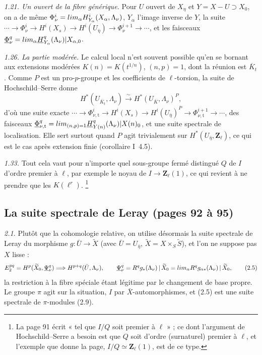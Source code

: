 \documentclass[11pt,a4paper]{article}
\begin{document}
\emph{1.21. Un ouvert de la fibre générique.} Pour $U$ ouvert de $X_\eta$ et
$Y = X - U \supset X_0$, on a de même $\Phi^i_\nu = \varinjlim_\alpha
H^i_{Y_\alpha}(X_\alpha, \Lambda_\nu)$, $Y_\alpha$ l'image inverse de $Y$, la
suite $\cdots \to \Phi^i_\nu \to H^i(X_s) \to H^i(U_{\bar\eta}) \to
\Phi^{i+1}_\nu \to \cdots$, et les faisceaux $\underline\Phi^q_\nu =
\varinjlim_\alpha \underline H^q_{Y_\alpha}(\Lambda_\nu)|X_{\alpha,0}$.

\emph{1.26. La partie modérée.} Le calcul local n'est souvent possible qu'en se
bornant aux extensions modérées $K(n) = K(t^{1/n})$, $(n,p) = 1$, dont la
réunion est $\overline K_t$. Comme $P$ est un pro-$p$-groupe et les coefficients
de $\ell$-torsion, la suite de Hochschild--Serre donne
\[
  H^*(U_{\overline K_t}, \Lambda_\nu) \xrightarrow{\ \sim\ } H^*(U_{\overline K}, \Lambda_\nu)^P ,
\]
d'où une suite exacte $\cdots \to \Phi^i_{\nu,\mathrm{t}} \to H^i(X_s) \to
H^i(U_{\bar\eta})^P \to \Phi^{i+1}_{\nu,\mathrm{t}} \to \cdots$, des faisceaux
$\underline\Phi^q_{\nu,\mathrm{t}} = \varinjlim_{(n,p)=1}
\underline H^q_{Y(n)}(\Lambda_\nu)|X(n)_0$, et une suite spectrale de
localisation. Elle sert surtout quand $P$ agit trivialement sur
$H^*(U_{\bar\eta}, \mathbf{Z}_\ell)$, ce qui est le cas après extension finie
(corollaire I~4.5).

\emph{1.33.} Tout cela vaut pour n'importe quel sous-groupe fermé distingué $Q$
de $I$ d'ordre premier à $\ell$, par exemple le noyau de
$I \to \mathbf{Z}_\ell(1)$, ce qui revient à ne prendre que les $K(\ell^r)$.
\footnote{La page 91 écrit « tel que $I/Q$ soit premier à $\ell$ » ; ce dont
l'argument de Hochschild--Serre a besoin est que $Q$ soit d'ordre (surnaturel)
premier à $\ell$, et l'exemple que donne la page, $I/Q \simeq
\mathbf{Z}_\ell(1)$, est de ce type.}

\subsection*{La suite spectrale de Leray (pages 92 à 95)}

\emph{2.1.} Plutôt que la cohomologie relative, on utilise désormais la suite
spectrale de Leray du morphisme $g : \bar U \to \widetilde X$ (avec
$\bar U = U_{\bar\eta}$, $\widetilde X = X \times_S \widetilde S$), et l'on ne
suppose pas $X$ lisse :
\[
  E_2^{pq} = H^p(\widetilde X_0, \underline\Psi^q_\nu) \Longrightarrow
  H^{p+q}(\bar U, \Lambda_\nu), \qquad
  \underline\Psi^q_\nu = R^q g_*(\Lambda_\nu)\,|\,\widetilde X_0
  = \varinjlim_\alpha R^q g_{\alpha *}(\Lambda_\nu)\,|\,\widetilde X_0 ,
  \tag{2.5}
\]
la restriction à la fibre spéciale étant légitime par le changement de base
propre. Le groupe $\pi$ agit sur la situation, $I$ par $\bar X$-automorphismes,
et (2.5) est une suite spectrale de $\pi$-modules (2.9).
\end{document}
